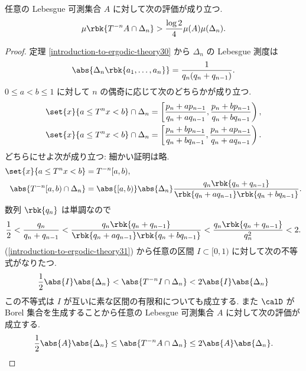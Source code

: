 \documentclass[openany, a4paper, oneside]{jsbook}
\begin{document}
\begin{lem}\label{introduction-to-ergodic-theory4}
任意の Lebesgue 可測集合 $A$ に対して次の評価が成り立つ.
\begin{align}
 \mu \rbk{T^{-n} A \cap \Delta_n}
 >
 \frac{\log 2}{4} \mu (A) \mu (\Delta_n).
\end{align}
\end{lem}
\begin{proof}
定理 \ref{introduction-to-ergodic-theory30} から $\Delta_n$ の Lebesgue 測度は
\begin{align}
 \abs{\Delta_n \rbk{a_1, \dots, a_n}}
 =
 \frac{1}{q_n (q_n + q_{n-1})}.
\end{align}
$0 \leq a < b \leq 1$ に対して $n$ の偶奇に応じて次のどちらかが成り立つ.
\begin{align}
 \set{x}{a \leq T^n x < b} \cap \Delta_n
 &=
 \left[\frac{p_n + a p_{n-1}}{q_n + a q_{n-1}}, \frac{p_n + b p_{n-1}}{q_n + b q_{n-1}} \right), \\
 \set{x}{a \leq T^n x < b} \cap \Delta_n
 &=
 \left[\frac{p_n + b p_{n-1}}{q_n + b q_{n-1}}, \frac{p_n + a p_{n-1}}{q_n + a q_{n-1}} \right).
\end{align}
どちらにせよ次が成り立つ: 細かい証明は略.
\begin{align}
 \set{x}{a \leq T^n x < b}
 &=
 T^{-n} [a, b), \\
 \abs{T^{-n} [a, b) \cap \Delta_n}
 &=
 \abs{[a, b)} \abs{\Delta_n} \frac{q_n \rbk{q_n + q_{n-1}}}{\rbk{q_n + a q_{n-1}} \rbk{q_n + b q_{n-1}}}. \label{introduction-to-ergodic-theory31}
\end{align}
数列 $\rbk{q_n}$ は単調なので
\begin{align}
 \frac{1}{2}
 <
 \frac{q_n}{q_n + q_{n-1}}
 <
 \frac{q_n \rbk{q_n + q_{n-1}}}{\rbk{q_n + a q_{n-1}} \rbk{q_n + b q_{n-1}}}
 <
 \frac{q_n \rbk{q_n + q_{n-1}}}{q_n^2}
 < 2.
\end{align}
(\ref{introduction-to-ergodic-theory31}) から任意の区間 $I \subset [0, 1)$ に対して次の不等式がなりたつ.
\begin{align}
 \frac{1}{2} \abs{I} \abs{\Delta_n}
 <
 \abs{T^{-n} I \cap \Delta_n}
 <
 2 \abs{I} \abs{\Delta_n}
\end{align}
この不等式は $I$ が互いに素な区間の有限和についても成立する.
また $\calD$ が Borel 集合を生成することから任意の Lebesgue 可測集合 $A$ に対して次の評価が成立する.
\begin{align}
 \frac{1}{2} \abs{A} \abs{\Delta_n}
 \leq
 \abs{T^{-n} A \cap \Delta_n}
 \leq
 2 \abs{A} \abs{\Delta_n}. \label{introduction-to-ergodic-theory32}
\end{align}


\end{proof}
\end{document}
